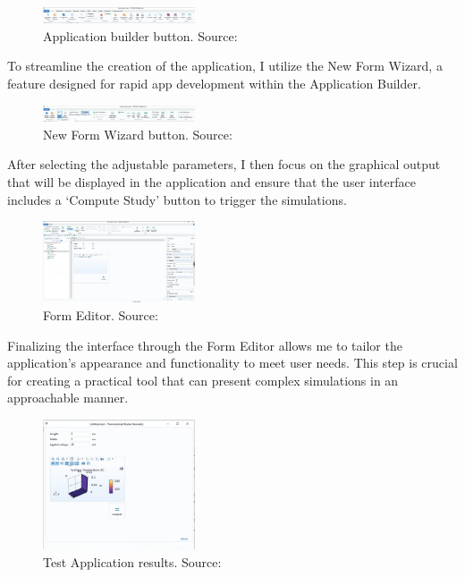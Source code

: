 \begin{figure}[H]
    \centering
    \includegraphics[width=0.4\textwidth]{Chapters/Figures/Chapter 3 Figures/Application Builder Button.png}
    \caption{Application builder button. Source: \cite{multiphysics__modeling_nodate}}
    \label{fig:application builder button}
\end{figure}

To streamline the creation of the application, I utilize the New Form Wizard, a feature designed for rapid app development within the Application Builder.

\begin{figure}[H]
    \centering
    \includegraphics[width=0.4\textwidth]{Chapters/Figures/Chapter 3 Figures/New Form Wizard Button.png}
    \caption{New Form Wizard button. Source: \cite{multiphysics__modeling_nodate}}
    \label{fig:New Form Wizard button}
\end{figure}

After selecting the adjustable parameters, I then focus on the graphical output that will be displayed in the application and ensure that the user interface includes a `Compute Study' button to trigger the simulations.

\begin{figure}[H]
    \centering
    \includegraphics[width=0.4\textwidth]{Chapters/Figures/Chapter 3 Figures/Form Editor Desktop.png}
    \caption{Form Editor. Source: \cite{multiphysics__modeling_nodate}}
    \label{fig:Form Editor}
\end{figure}

Finalizing the interface through the Form Editor allows me to tailor the application's appearance and functionality to meet user needs. This step is crucial for creating a practical tool that can present complex simulations in an approachable manner.

\begin{figure}[H]
    \centering
    \includegraphics[width=0.4\textwidth]{Chapters/Figures/Chapter 3 Figures/Test Application Results.png}
    \caption{Test Application results. Source: \cite{multiphysics__modeling_nodate}}
    \label{fig:Test Application results}
\end{figure}

